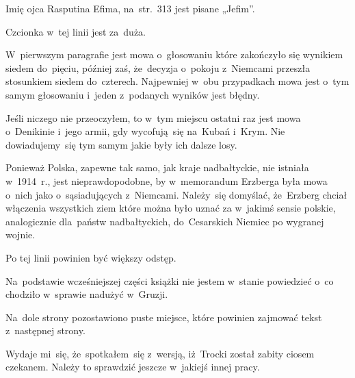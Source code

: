 \documentclass[a4paper,11pt]{article}
\begin{document}
\vspace{\spaceFour}


\start {} Imię ojca Rasputina Efima, na~str.~313 jest
pisane „Jefim”.

\vspace{\spaceFour}


\start {} Czcionka w~tej linii jest za~duża.

\vspace{\spaceFour}


\start {} W~pierwszym paragrafie jest mowa o~głosowaniu które
zakończyło się wynikiem siedem do~pięciu, później zaś, że~decyzja
o~pokoju z~Niemcami przeszła stosunkiem siedem do~czterech. Najpewniej
w~obu przypadkach mowa jest o~tym samym głosowaniu i~jeden z~podanych
wyników jest błędny.

\vspace{\spaceFour}


\start {} Jeśli niczego nie przeoczyłem, to w~tym miejscu
ostatni raz jest mowa o~Denikinie i~jego armii, gdy wycofują~się
na~Kubań i~Krym. Nie dowiadujemy~się tym samym jakie były ich dalsze
losy.

\vspace{\spaceFour}


\start {} Ponieważ Polska, zapewne tak samo, jak kraje
nadbałtyckie, nie istniała w~1914~r., jest nieprawdopodobne, by
w~memorandum Erzberga była mowa o~nich jako o~sąsiadujących
z~Niemcami. Należy~się domyślać, że~Erzberg chciał włączenia
wszystkich ziem które można było uznać za w~jakimś sensie polskie,
analogicznie dla~państw nadbałtyckich, do~Cesarskich Niemiec po
wygranej wojnie.

\vspace{\spaceFour}


\start {} Po tej linii powinien być większy odstęp.

\vspace{\spaceFour}


\start {} Na~podstawie wcześniejszej części książki nie
jestem w~stanie powiedzieć o~co chodziło w~sprawie nadużyć w~Gruzji.

\vspace{\spaceFour}


\start {} Na~dole strony pozostawiono puste miejsce, które
powinien zajmować tekst z~następnej strony.

\vspace{\spaceFour}


\start {} Wydaje mi~się, że~spotkałem~się z~wersją,
iż~Trocki został zabity ciosem czekanem. Należy to sprawdzić jeszcze
w~jakiejś innej pracy.
\end{document}
